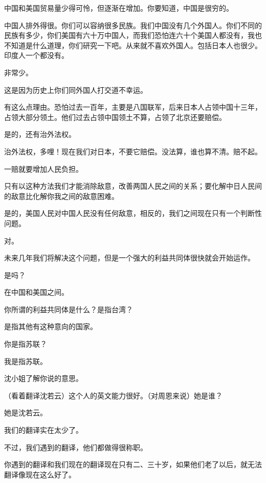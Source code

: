中国和美国贸易量少得可怜，但逐渐在增加。你要知道，中国是很穷的。

中国人排外得很。你们可以容纳很多民族。我们中国没有几个外国人。你们不同的民族有多少，你们美国有六十万中国人，而我们恐怕连六十个美国人都没有，我也不知道是什么道理，你们研究一下吧。从来就不喜欢外国人。包括日本人也很少。印度人一个都没有。

非常少。

这是因为历史上你们同外国人打交道不幸运。

有这么点理由。恐怕过去一百年，主要是八国联军，后来日本人占领中国十三年，占领大部分领土。他们过去占领中国领土不算，占领了北京还要赔偿。

是的，还有治外法权。

治外法权，多哩！现在我们对日本，不要它赔偿。没法算，谁也算不清。赔不起。

一赔就要增加人民负担。

只有以这种方法我们才能消除敌意，改善两国人民之间的关系；要化解中日人民间的敌意比化解你我之间的敌意困难。

是的，美国人民对中国人民没有任何敌意，相反的，我们之间现在只有一个判断性问题。

对。

未来几年我们将解决这个问题，但是一个强大的利益共同体很快就会开始运作。

是吗？

在中国和美国之间。

你所谓的利益共同体是什么？是指台湾？

是指其他有这种意向的国家。

你是指苏联？

我是指苏联。

沈小姐了解你说的意思。

（看着翻译沈若云）这个人的英文能力很好。（对周恩来说）她是谁？

她是沈若云。

我们的翻译实在太少了。

不过，我们遇到的翻译，他们都做得很称职。

你遇到的翻译和我们现在的翻译现在只有二、三十岁，如果他们老了以后，就无法翻译像现在这么好了。

